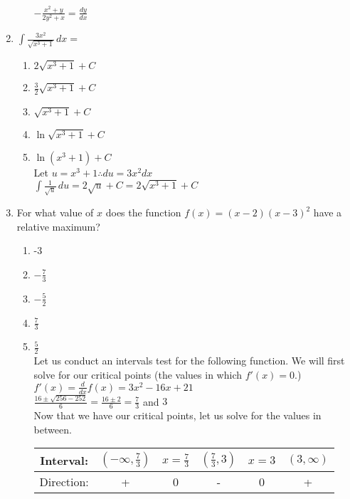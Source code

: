 \documentclass[10pt, letterpaper]{report}
\begin{document}
\begin{enumerate}
\begin{enumerate}
      $-\frac{x^{2}+y}{2y^{2}+x}=\frac{dy}{dx}$ \\
      \hline
    \end{enumerate}
  \item{$\int{\frac{3x^{2}}{\sqrt{x^{3}+1}}}\,dx=$}
    \begin{enumerate}
      \item{$2\sqrt{x^{3}+1}+C$}
      \item{$\frac{3}{2}\sqrt{x^{3}+1}+C$}
      \item{$\sqrt{x^{3}+1}+C$}
      \item{$\ln{\sqrt{x^{3}+1}}+C$}
      \item{$\ln{(x^{3}+1)}+C$} \\

      Let $u=x^{3}+1\therefore du=3x^{2}dx$ \\

      $\int{\frac{1}{\sqrt{u}}}\,du=2\sqrt{u}+C=2\sqrt{x^{3}+1}+C$
    \end{enumerate}
    \pagebreak
  \item{For what value of $x$ does the function $f(x)=(x-2)(x-3)^{2}$ have a relative maximum?}
    \begin{enumerate}
      \item{-3}
      \item{$-\frac{7}{3}$}
      \item{$-\frac{5}{2}$}
      \item{$\frac{7}{3}$}
      \item{$\frac{5}{2}$} \\

      Let us conduct an intervals test for the following function. We will first solve for our critical points (the values in which $f'(x)=0$.) \\

      $f'(x)=\frac{d}{dx}f(x)=3x^{2}-16x+21$ \\

      $\frac{16\pm\sqrt{256-252}}{6}=\frac{16\pm2}{6}=\frac{7}{3}$ and $3$\\

      Now that we have our critical points, let us solve for the values in between. \\

      \begin{center}
        \begin{tabular}{| c | c | c | c | c | c |}
          \hline
          Interval: & $\left(-\infty, \frac{7}{3}\right)$ & $x=\frac{7}{3}$ & $\left(\frac{7}{3},3 \right)$ & $x=3$ & $(3, \infty)$ \\
          \hline
          Direction: & + & 0 & - & 0 & + \\
          \hline
        \end{tabular}
      \end{center}


\end{enumerate}
\end{enumerate}
\end{document}
